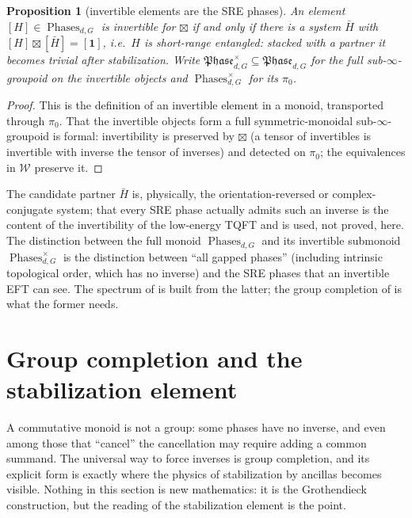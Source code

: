 \documentclass[12pt]{article}
\newcommand{\Phase}{\mathfrak{Phase}}          %
\newcommand{\Phases}{\operatorname{Phases}}    %
\newcommand{\Weq}{\mathcal{W}}                 %
\newcommand{\triv}{\mathbf{1}}               %
\newcommand{\inv}[1]{\Phase_{#1}^{\times}}   %
\newtheorem{proposition}[proposition]{Proposition}
\theoremstyle{definition}
\theoremstyle{remark}
\theoremstyle{plain}
\begin{document}
\begin{proposition}[invertible elements are the SRE phases]
\label{prop:sre}
An element $[H]\in\Phases_{d,G}$ is invertible for $\boxtimes$ if and only if
there is a system $\bar H$ with $[H]\boxtimes[\bar H]=[\triv]$, i.e.\ $H$ is
\emph{short-range entangled}: stacked with a partner it becomes trivial after
stabilization. Write $\inv{d,G}\subseteq\Phase_{d,G}$ for the full sub-$\infty$-groupoid
on the invertible objects and $\Phases_{d,G}^{\times}$ for its $\pi_0$.
\end{proposition}

\begin{proof}
This is the definition of an invertible element in a monoid, transported through
$\pi_0$. That the invertible objects form a full symmetric-monoidal
sub-$\infty$-groupoid is formal: invertibility is preserved by $\boxtimes$
(a tensor of invertibles is invertible with inverse the tensor of inverses) and
detected on $\pi_0$; the equivalences in $\Weq$ preserve it.
\end{proof}

The candidate partner $\bar H$ is, physically, the orientation-reversed or
complex-conjugate system; that every SRE phase actually admits such an inverse is
the content of the invertibility of the low-energy TQFT
\cite{freed-sre,freed-hopkins} and is used, not proved, here. The distinction
between the full monoid $\Phases_{d,G}$ and its invertible submonoid
$\Phases_{d,G}^{\times}$ is the distinction between ``all gapped phases''
(including intrinsic topological order, which has no inverse) and the SRE phases
that an invertible EFT can see. The spectrum of  is built from
the latter; the group completion of  is what the former
needs.

\section{Group completion and the stabilization element}
\label{sec:groupcompletion}

A commutative monoid is not a group: some phases have no inverse, and even among
those that ``cancel'' the cancellation may require adding a common summand. The
universal way to force inverses is group completion, and its explicit form is
exactly where the physics of stabilization by ancillas becomes visible. Nothing
in this section is new mathematics: it is the Grothendieck construction, but
the reading of the stabilization element is the point.
\end{document}
